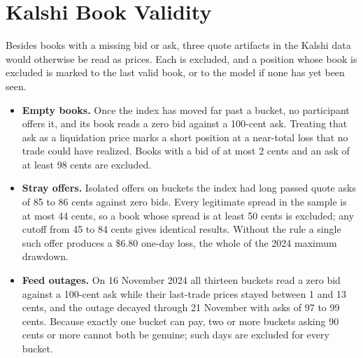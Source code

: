 \documentclass{article}
\begin{document}
\section{Kalshi Book Validity}\label{app:book}
Besides books with a missing bid or ask, three quote artifacts in the Kalshi data would otherwise be read as prices. Each is excluded, and a position whose book is excluded is marked to the last valid book, or to the model if none has yet been seen.
\begin{itemize}
  \item \textbf{Empty books.} Once the index has moved far past a bucket, no participant offers it, and its book reads a zero bid against a 100-cent ask. Treating that ask as a liquidation price marks a short position at a near-total loss that no trade could have realized. Books with a bid of at most 2 cents and an ask of at least 98 cents are excluded.
  \item \textbf{Stray offers.} Isolated offers on buckets the index had long passed quote asks of 85 to 86 cents against zero bids. Every legitimate spread in the sample is at most 44 cents, so a book whose spread is at least 50 cents is excluded; any cutoff from 45 to 84 cents gives identical results. Without the rule a single such offer produces a \$6.80 one-day loss, the whole of the 2024 maximum drawdown.
  \item \textbf{Feed outages.} On 16 November 2024 all thirteen buckets read a zero bid against a 100-cent ask while their last-trade prices stayed between 1 and 13 cents, and the outage decayed through 21 November with asks of 97 to 99 cents. Because exactly one bucket can pay, two or more buckets asking 90 cents or more cannot both be genuine; such days are excluded for every bucket.
\end{itemize}
\end{document}
